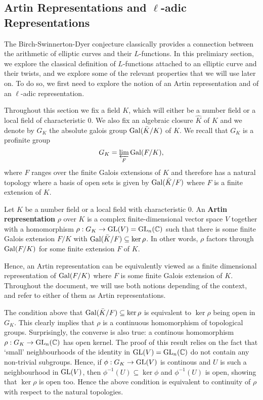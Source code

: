 \subsection{Artin Representations and  \texorpdfstring{$\ell$}{TEXT}-adic Representations} \label{subsection_reps}

The Birch-Swinnerton-Dyer conjecture classically provides a connection between the arithmetic of elliptic curves and their $L$-functions. In this prelimiary section, we explore the classical definition of $L$-functions attached to an elliptic curve and their twists, and we explore some of the relevant properties that we will use later on. To do so, we first need to explore the notion of an Artin representation and of an $\ell$-adic representation. 

Throughout this section we fix a field $K$, which will either be a number field or a local field of characteristic $0$. We also fix an algebraic closure $\hat{K}$ of $K$ and we denote by $G_K$ the absolute galois group $\mathrm{Gal}(\bar{K}/K)$ of $K$. We recall that $G_K$ is a profinite group
$$G_K=\varprojlim_{F}\mathrm{Gal}(F/K),$$
where $F$ ranges over the finite Galois extensions of $K$ and therefore has a natural topology where a basis of open sets is given by $\mathrm{Gal}(\bar{K}/F)$ where $F$ is a finite extension of $K$.

\begin{defn}
    Let $K$ be a number field or a local field with characteristic $0$. An \textbf{Artin representation} $\rho$ over $K$ is a complex finite-dimensional vector space $V$ together with a homomorphism $\rho:G_K\to\mathrm{GL}(V)=\mathrm{GL}_n(\mathbb{C})$ such that there is some finite Galois extension $F/K$ with $\mathrm{Gal}(\bar{K}/F)\subseteq\ker\rho$. In other words, $\rho$ factors through $\mathrm{Gal}(F/K)$ for some finite extension $F$ of $K$.
\end{defn}

Hence, an Artin representation can be equivalently viewed as a finite dimensional representation of $\mathrm{Gal}(F/K)$ where $F$ is some finite Galois extension of $K$. Throughout the document, we will use both notions depending of the context, and refer to either of them as Artin representations.

\begin{rem}
    The condition above that $\mathrm{Gal}(\bar{K}/F)\subseteq\ker\rho$ is equivalent to $\ker\rho$ being open in $G_K$. This clearly implies that $\rho$ is a continuous homomorphism of topological groups. Surprisingly, the converse is also true: a continous homomorphism $\rho:G_K\to\mathrm{GL}_n(\mathbb{C})$ has open kernel. The proof of this result relies on the fact that `small' neighbourhoods of the identity in $\mathrm{GL}(V)=\mathrm{GL}_n(\mathbb{C})$ do not contain any non-trivial subgroups. Hence, if $\phi:G_K\to\mathrm{GL}(V)$ is continous and $U$ is such a neighbourhood in $\mathrm{GL}(V)$, then $\phi^{-1}(U)\subseteq\ker\phi$ and $\phi^{-1}(U)$ is open, showing that $\ker\rho$ is open too. Hence the above condition is equivalent to continuity of $\rho$ with respect to the natural topologies.
\end{rem}

